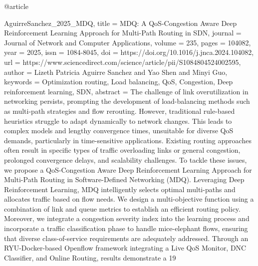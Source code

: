 {{%

@article{AguirreSanchez_2025_MDQ,
title = {{MDQ: A QoS-Congestion Aware Deep Reinforcement Learning Approach for Multi-Path Routing in SDN}},
journal = {Journal of Network and Computer Applications},
volume = {235},
pages = {104082},
year = {2025},
issn = {1084-8045},
doi = {https://doi.org/10.1016/j.jnca.2024.104082},
url = {https://www.sciencedirect.com/science/article/pii/S1084804524002595},
author = {Lizeth Patricia {Aguirre Sanchez} and Yao Shen and Minyi Guo},
keywords = {Optimization routing, Load balancing, QoS, Congestion, Deep reinforcement learning, SDN},
abstract = {The challenge of link overutilization in networking persists, prompting the development of load-balancing methods such as multi-path strategies and flow rerouting. However, traditional rule-based heuristics struggle to adapt dynamically to network changes. This leads to complex models and lengthy convergence times, unsuitable for diverse QoS demands, particularly in time-sensitive applications. Existing routing approaches often result in specific types of traffic overloading links or general congestion, prolonged convergence delays, and scalability challenges. To tackle these issues, we propose a QoS-Congestion Aware Deep Reinforcement Learning Approach for Multi-Path Routing in Software-Defined Networking (MDQ). Leveraging Deep Reinforcement Learning, MDQ intelligently selects optimal multi-paths and allocates traffic based on flow needs. We design a multi-objective function using a combination of link and queue metrics to establish an efficient routing policy. Moreover, we integrate a congestion severity index into the learning process and incorporate a traffic classification phase to handle mice-elephant flows, ensuring that diverse class-of-service requirements are adequately addressed. Through an RYU-Docker-based Openflow framework integrating a Live QoS Monitor, DNC Classifier, and Online Routing, results demonstrate a 19%
}

}}}
